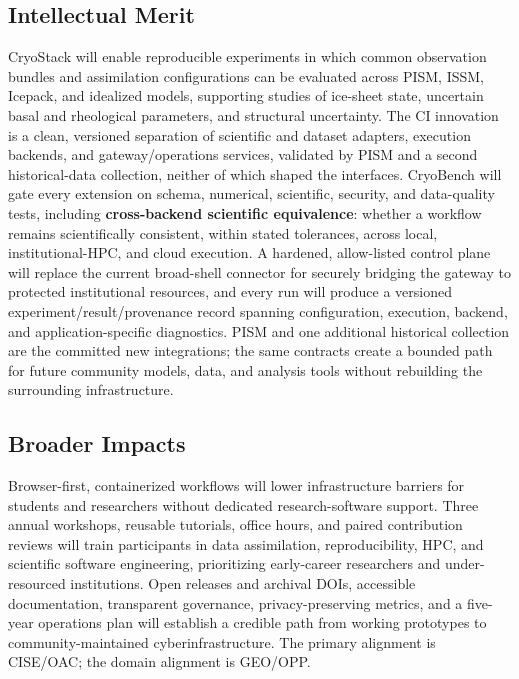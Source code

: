 \subsection*{Intellectual Merit}
CryoStack will enable reproducible experiments in which common observation
bundles and assimilation configurations can be evaluated across PISM, ISSM,
Icepack, and idealized models, supporting studies of ice-sheet state,
uncertain basal and rheological parameters, and structural uncertainty. The CI
innovation is a clean, versioned separation of scientific and dataset
adapters, execution backends, and gateway/operations services, validated by
PISM and a second historical-data collection, neither of which shaped the
interfaces. CryoBench
will gate every extension on schema, numerical, scientific, security, and
data-quality tests, including \textbf{cross-backend scientific equivalence}:
whether a workflow remains scientifically consistent, within stated
tolerances, across local, institutional-HPC, and cloud execution. A hardened, allow-listed control plane will
replace the current broad-shell connector for securely bridging the gateway
to protected institutional resources, and every run will produce a versioned
experiment/result/provenance record spanning configuration, execution,
backend, and application-specific diagnostics. PISM and one additional
historical collection are the committed new integrations; the same contracts
create a bounded path for future community models, data, and analysis tools
without rebuilding the surrounding infrastructure.

\subsection*{Broader Impacts}
Browser-first, containerized workflows will lower infrastructure barriers for
students and researchers without dedicated research-software support. Three
annual workshops, reusable tutorials, office hours, and paired contribution
reviews will train participants in data assimilation, reproducibility, HPC,
and scientific software engineering, prioritizing early-career researchers and
under-resourced institutions. Open releases and archival DOIs, accessible
documentation, transparent governance, privacy-preserving metrics, and a
five-year operations plan will establish a credible path from working
prototypes to community-maintained cyberinfrastructure. The primary alignment
is CISE/OAC; the domain alignment is GEO/OPP.
